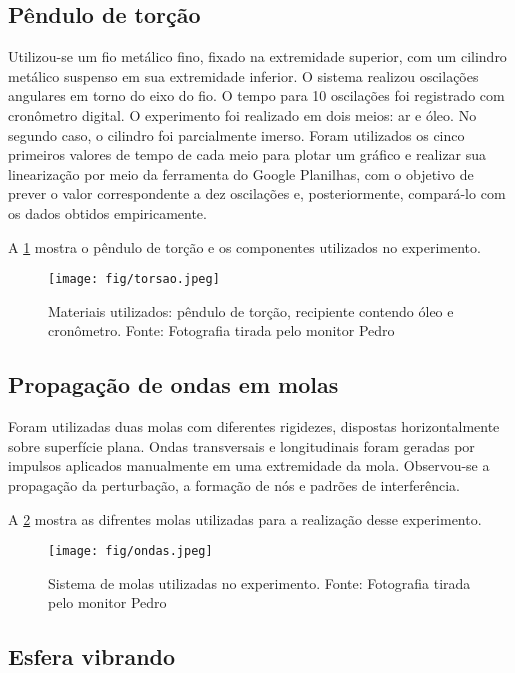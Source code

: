 \subsection{Pêndulo de torção}

Utilizou-se um fio metálico fino, fixado na extremidade superior, com um cilindro metálico suspenso em sua extremidade inferior. O sistema realizou oscilações angulares em torno do eixo do fio. O tempo para 10 oscilações foi registrado com cronômetro digital. O experimento foi realizado em dois meios: ar e óleo. No segundo caso, o cilindro foi parcialmente imerso. Foram utilizados os cinco primeiros valores de tempo de cada meio para plotar um gráfico e realizar sua linearização por meio da ferramenta do Google Planilhas, com o objetivo de prever o valor correspondente a dez oscilações e, posteriormente, compará-lo com os dados obtidos empiricamente.

A \cref{fig:torsao} mostra o pêndulo de torção e os componentes utilizados no experimento.

\begin{figure}[H]
    \centering
    \texttt{[image: fig/torsao.jpeg]}
    \caption{Materiais utilizados: pêndulo de torção, recipiente contendo óleo e cronômetro. Fonte: Fotografia tirada pelo monitor Pedro}
    \label{fig:torsao}
\end{figure}

\subsection{Propagação de ondas em molas}

Foram utilizadas duas molas com diferentes rigidezes, dispostas horizontalmente sobre superfície plana. Ondas transversais e longitudinais foram geradas por impulsos aplicados manualmente em uma extremidade da mola. Observou-se a propagação da perturbação, a formação de nós e padrões de interferência.

A \cref{fig:ondas} mostra as difrentes molas utilizadas para a realização desse experimento.

\begin{figure}[H]
    \centering
    \texttt{[image: fig/ondas.jpeg]}
    \caption{Sistema de molas utilizadas no experimento. Fonte: Fotografia tirada pelo monitor Pedro}
    \label{fig:ondas}
\end{figure}

\subsection{Esfera vibrando}

